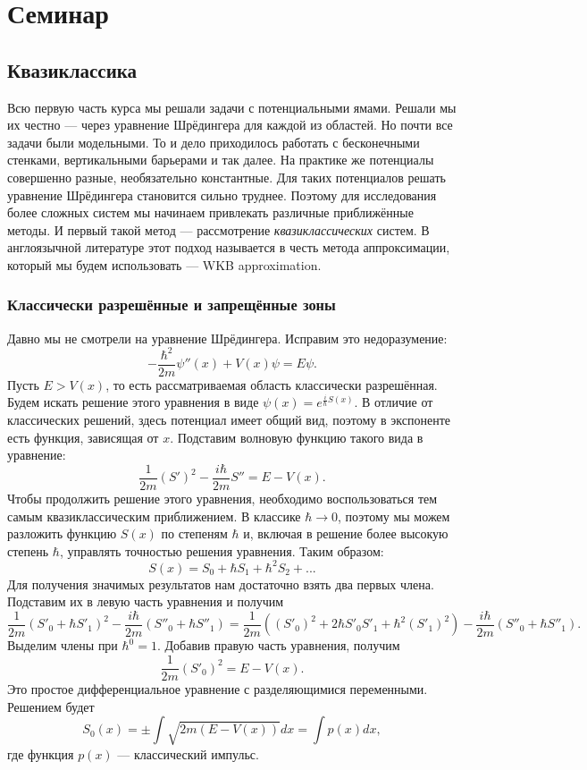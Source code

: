 \section{Семинар \thesection}
\subsection{Квазиклассика}
Всю первую часть курса мы решали задачи с потенциальными ямами. Решали мы их
честно --- через уравнение Шрёдингера для каждой из областей. Но почти все
задачи были модельными. То и дело приходилось работать с бесконечными стенками,
вертикальными барьерами и так далее. На практике же потенциалы совершенно
разные, необязательно константные. Для таких потенциалов решать уравнение
Шрёдингера становится сильно труднее. Поэтому для исследования более сложных
систем мы начинаем привлекать различные приближённые методы. И первый такой
метод --- рассмотрение \textit{квазиклассических} систем. В англоязычной
литературе этот подход называется в честь метода аппроксимации, который мы
будем использовать --- WKB approximation.

\subsubsection{Классически разрешённые и запрещённые зоны}
Давно мы не смотрели на уравнение Шрёдингера. Исправим это недоразумение:
\[
  -\frac{\hbar^2}{2m}\psi''(x) + V(x)\psi = E\psi.
\]
Пусть $E > V(x)$, то есть рассматриваемая область классически разрешённая.
Будем искать решение этого уравнения в виде $\psi(x) =
  e^{\frac{i}{\hbar}S(x)}$. В отличие от классических решений, здесь потенциал
имеет общий вид, поэтому в экспоненте есть функция, зависящая от $x$. Подставим
волновую функцию такого вида в уравнение:
\[
  \frac{1}{2m}(S')^2 - \frac{i\hbar}{2m}S'' = E - V(x).
\]
Чтобы продолжить решение этого уравнения, необходимо воспользоваться тем самым
квазиклассическим приближением. В классике $\hbar \rightarrow 0$, поэтому мы
можем разложить функцию $S(x)$ по степеням $\hbar$ и, включая в решение более
высокую степень $\hbar$, управлять точностью решения уравнения. Таким образом:
\[
  S(x) = S_0 + \hbar S_1 + \hbar^2 S_2 + ...
\]
Для получения значимых результатов нам достаточно взять два первых члена.
Подставим их в левую часть уравнения и получим
\[
  \frac{1}{2m}\left( S'_0 + \hbar S'_1 \right)^2 - \frac{i\hbar}{2m}(S''_0 + \hbar S''_1) = \frac{1}{2m}\left( (S'_0)^2 + 2\hbar S'_0 S'_1 + \hbar^2 (S'_1)^2 \right) - \frac{i\hbar}{2m}(S''_0 + \hbar S''_1).
\]
Выделим члены при $\hbar^0 = 1$. Добавив правую часть уравнения, получим
\[
  \frac{1}{2m}(S'_0)^2 = E - V(x).
\]
Это простое дифференциальное уравнение с разделяющимися переменными. Решением
будет
\[
  S_0(x) = \pm \int\sqrt{2m\left( E - V(x) \right)}dx = \int p(x)dx,
\]
где функция $p(x)$ --- классический импульс.


